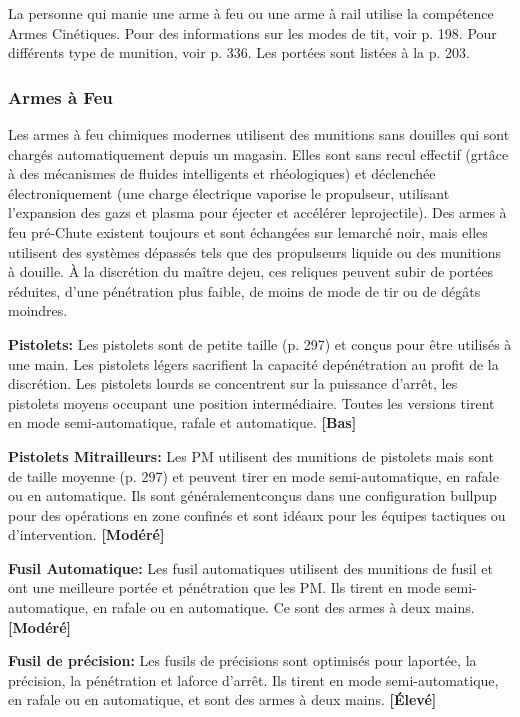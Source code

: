 La personne qui manie une arme à feu ou une arme à rail utilise la compétence Armes Cinétiques. Pour des informations sur les modes de tit, voir p. 198. Pour différents type de munition, voir p. 336. Les portées sont listées à la p. 203. 

\subsubsection{Armes à Feu} 

Les armes à feu chimiques modernes utilisent des munitions sans douilles qui sont chargés automatiquement depuis un magasin. Elles sont sans recul effectif (grtâce à des mécanismes de fluides intelligents et rhéologiques) et déclenchée électroniquement (une charge électrique vaporise le propulseur, utilisant l'expansion des gazs et plasma pour éjecter et accélérer leprojectile). Des armes à feu pré-Chute existent toujours et sont échangées sur lemarché noir, mais elles utilisent des systèmes dépassés tels que des propulseurs liquide ou des munitions à douille. À la discrétion du maître dejeu, ces reliques peuvent subir de portées réduites, d'une pénétration plus faible, de moins de mode de tir ou de dégâts moindres. 

\textbf{Pistolets:} Les pistolets sont de petite taille (p. 297) et conçus pour être utilisés à une main. Les pistolets légers sacrifient la capacité depénétration au profit de la discrétion. Les pistolets lourds se concentrent sur la puissance d'arrêt, les pistolets moyens occupant une position intermédiaire. Toutes les versions tirent en mode semi-automatique, rafale et automatique. \textbf{[Bas]} 

\textbf{Pistolets Mitrailleurs:} Les PM utilisent des munitions de pistolets mais sont de taille moyenne (p. 297) et peuvent tirer en mode semi-automatique, en rafale ou en automatique. Ils sont généralementconçus dans une configuration bullpup pour des opérations en zone confinés et sont idéaux pour les équipes tactiques ou d'intervention. \textbf{[Modéré]} 

\textbf{Fusil Automatique:} Les fusil automatiques utilisent des munitions de fusil et ont une meilleure portée et pénétration que les PM. Ils tirent en mode semi-automatique, en rafale ou en automatique. Ce sont des armes à deux mains. \textbf{[Modéré]} 

\textbf{Fusil de précision:} Les fusils de précisions sont optimisés pour laportée, la précision, la pénétration et laforce d'arrêt. Ils tirent en mode semi-automatique, en rafale ou en automatique, et sont des armes à deux mains. \textbf{[Élevé]} 

